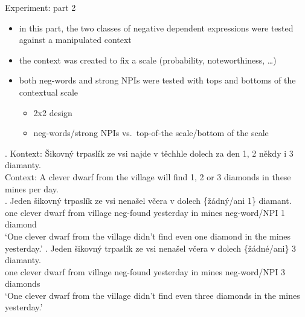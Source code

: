 \documentclass[
  ignorenonframetext,
]{beamer}
\providecommand{\tightlist}{%
  \setlength{\itemsep}{0pt}\setlength{\parskip}{0pt}}\usepackage{longtable,booktabs,array}
\begin{document}
\begin{frame}
\begin{block}{Experiment: part 2}
\protect\hypertarget{experiment-part-2}{}
\begin{itemize}
\tightlist
\item
  in this part, the two classes of negative dependent expressions were
  tested against a manipulated context
\item
  the context was created to fix a scale (probability, noteworthiness,
  \ldots)
\item
  both neg-words and strong NPIs were tested with tops and bottoms of
  the contextual scale

  \begin{itemize}
  \tightlist
  \item
    2x2 design
  \item
    neg-words/strong NPIs vs.~top-of-the scale/bottom of the scale
  \end{itemize}
\end{itemize}
\end{block}
\end{frame}

\begin{frame}
\ex. Kontext: Šikovný trpaslík ze vsi najde v těchhle dolech za den 1, 2
někdy i 3 diamanty.\\
Context: A clever dwarf from the village will find 1, 2 or 3 diamonds in
these mines per day.\\
\ag. Jeden šikovný trpaslík ze vsi nenašel včera v dolech \{žádný/ani
1\} diamant.\\
one clever dwarf from village neg-found yesterday in mines neg-word/NPI
1 diamond\\
`One clever dwarf from the village didn't find even one diamond in the
mines yesterday.' \bg. Jeden šikovný trpaslík ze vsi nenašel včera v
dolech \{žádné/ani\} 3 diamanty.\\
one clever dwarf from village neg-found yesterday in mines neg-word/NPI
3 diamonds\\
`One clever dwarf from the village didn't find even three diamonds in
the mines yesterday.'

~
\end{frame}
\end{document}
